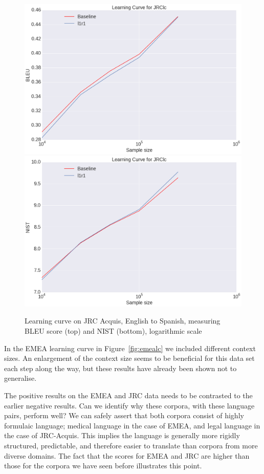 \documentclass[smallextended]{svjour3}       %
\theoremstyle{break}
\begin{document}
\begin{figure}
\includegraphics[width=120.00mm]{jrclcbleu.png}
\includegraphics[width=120.00mm]{jrclcnist.png}
\caption{Learning curve on JRC Acquis, English to Spanish, measuring BLEU score (top) and NIST (bottom), logarithmic scale}
\label{fig:jrclc}
\end{figure}


In the EMEA learning curve in Figure~\ref{fig:emealc} we included different
context sizes.  An enlargement of the context size seems to be beneficial for
this data set each step along the way, but these results have already been
shown not to generalise.

The positive results on the EMEA and JRC data needs to be
contrasted to the earlier negative results. Can we identify why these
corpora, with these language pairs, perform well? We can safely assert
that both corpora consist of highly formulaic language; medical language in the
case of EMEA, and legal language in the case of JRC-Acquis.  This
implies the language is generally more rigidly structured,
predictable, and therefore easier to translate than corpora from more
diverse domains. The fact that the scores for EMEA and JRC are higher
than those for the corpora we have seen before illustrates this
point.
\end{document}
